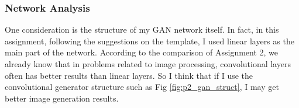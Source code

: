 \subsubsection{Network Analysis}

One consideration is the structure of my GAN network itself.
In fact, in this assignment, following the suggestions on the template, I used linear layers as the main part of the network.
According to the comparison of Assignment 2, we already know that in problems related to image processing, convolutional layers often has better results than linear layers.
So I think that if I use the convolutional generator structure such as Fig \ref{fig:p2_gan_struct}, I may get better image generation results.
